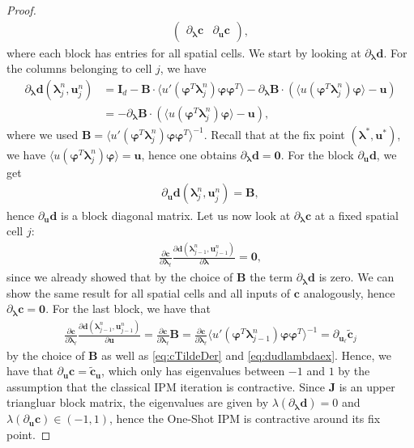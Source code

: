 \begin{proof}
\begin{align}
\begin{pmatrix}
\partial_{\bm{\lambda}} \bm{c} & \partial_{\bm{u}} \bm{c}
\end{pmatrix},
\end{align}
where each block has entries for all spatial cells. We start by looking at $\partial_{\bm{\lambda}} \bm{d}$. For the columns belonging to cell $j$, we have
\begin{align*}
\partial_{\bm{\lambda}} \bm{d}(\bm{\lambda}_j^n,\bm{u}_j^n) &= \bm{I}_d - \bm{B} \cdot \langle u'(\bm{\varphi}^T\bm{\lambda}_j^n)\bm{\varphi}\bm{\varphi}^T \rangle - \partial_{\bm{\lambda}}\bm{B} \cdot \left( \langle u(\bm{\varphi}^T\bm{\lambda}_j^n)\bm{\varphi} \rangle - \bm{u}\right) \\
&=- \partial_{\bm{\lambda}}\bm{B} \cdot \left( \langle u(\bm{\varphi}^T\bm{\lambda}_j^n)\bm{\varphi} \rangle - \bm{u}\right),
\end{align*}
where we used $\bm{B} = \langle u'(\bm{\varphi}^T\bm{\lambda}_j^n)\bm{\varphi}\bm{\varphi}^T \rangle^{-1}$. Recall that at the fix point $(\bm{\lambda}^*,\bm{u}^*)$, we have $\langle u(\bm{\varphi}^T\bm{\lambda}_j^n)\bm{\varphi} \rangle = \bm{u}$, hence one obtains $\partial_{\bm{\lambda}} \bm{d}=\bm{0}$. For the block $\partial_{\bm{u}} \bm{d}$, we get 
\begin{align*}
\partial_{\bm{u}} \bm{d}(\bm{\lambda}_j^n,\bm{u}_j^n) = \bm{B},
\end{align*}
hence $\partial_{\bm{u}} \bm{d}$ is a block diagonal matrix. Let us now look at $\partial_{\bm{\lambda}} \bm{c}$ at a fixed spatial cell $j$:
\begin{align*}
\frac{\partial \bm{c}}{\partial \bm{\lambda}_{\ell}}\frac{\partial \bm{d}(\bm{\lambda}_{j-1}^{n},\bm{u}_{j-1}^{n})}{\partial \bm{\lambda}} = \bm{0},
\end{align*}
since we already showed that by the choice of $\bm{B}$ the term $\partial_{\bm{\lambda}} \bm{d}$ is zero. We can show the same result for all spatial cells and all inputs of $\bm{c}$ analogously, hence $\partial_{\bm{\lambda}} \bm{c} = \bm{0}$. For the last block, we have that 
\begin{align*}
\frac{\partial \bm{c}}{\partial \bm{\lambda}_{\ell}}\frac{\partial \bm{d}(\bm{\lambda}_{j-1}^{n},\bm{u}_{j-1}^{n})}{\partial \bm{u}} = \frac{\partial \bm{c}}{\partial \bm{\lambda}_{\ell}} \bm{B} = \frac{\partial \bm{c}}{\partial \bm{\lambda}_{\ell}} \langle u'(\bm{\varphi}^T\bm{\lambda}_{j-1}^n)\bm{\varphi}\bm{\varphi}^T \rangle^{-1} = \partial_{\bm{u}_{\ell}}\bm{\tilde c}_j
\end{align*}
by the choice of $\bm{B}$ as well as \eqref{eq:cTildeDer} and \eqref{eq:dudlambdaex}. Hence, we have that $\partial_{\bm{u}} \bm{c} = \bm{\tilde c}_{\bm{u}}$, which only has eigenvalues between $-1$ and $1$ by the assumption that the classical IPM iteration is contractive. Since $\bm{J}$ is an upper triangluar block matrix, the eigenvalues are given by $\lambda\left(\partial_{\bm{\lambda}} \bm{d}\right) = 0$ and $\lambda\left(\partial_{\bm{u}} \bm{c}\right)\in(-1,1)$, hence the One-Shot IPM is contractive around its fix point.
\end{proof}
